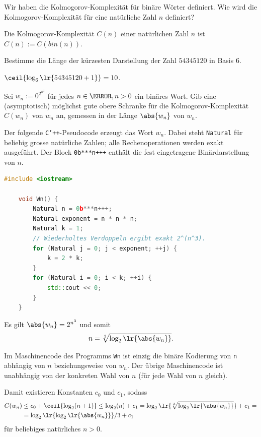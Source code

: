 \begin{questions}
	\question[2] Wir haben die Kolmogorov-Komplexität für binäre Wörter definiert. Wie wird die Kolmogorov-Komplexität für eine natürliche Zahl $n$ definiert?
	\begin{solution}
	Die Kolmogorov-Komplexität $C(n)$ einer natürlichen Zahl $n$ ist $C(n) := C(bin(n))$.
	\end{solution}


	\question[2] Bestimme die Länge der kürzesten Darstellung der Zahl $54345120$ in Basis $6$.
	\begin{solution}
		$\ceil{\log_6\lr{54345120 + 1}} = 10$.
	\end{solution}

	\question[2] Sei $w_n := 0^{2^{n^3}}$ für jedes $n\in\N, n>0$ ein binäres Wort.	Gib eine (asymptotisch) möglichst gute obere Schranke für die Kolmogorov-Komplexität $C(w_n)$ von $w_n$ an, gemessen in der Länge $\abs{w_n}$ von $w_n$.
	\begin{solution}
		Der folgende \texttt{C'++}-Pseudocode erzeugt das Wort $w_n$. Dabei steht \texttt{Natural} für beliebig grosse natürliche Zahlen; alle Rechenoperationen werden exakt ausgeführt. Der Block \texttt{0b***n+++} enthält die fest eingetragene Binärdarstellung von $n$.
		\begin{lstlisting}[language=C++,caption=$W_n$]
    #include <iostream>

    void Wn() {
        Natural n = 0b***n+++;
        Natural exponent = n * n * n;
        Natural k = 1;
        // Wiederholtes Verdoppeln ergibt exakt 2^(n^3).
        for (Natural j = 0; j < exponent; ++j) {
            k = 2 * k;
        }
        for (Natural i = 0; i < k; ++i) {
            std::cout << 0;
        }
    }
\end{lstlisting}
		Es gilt $\abs{w_n} = 2^{n^3}$ und somit
		\begin{align*}
			n = \sqrt[3]{\log_2\lr{\abs{w_n}}}.
		\end{align*}

		Im Maschinencode des Programms \texttt{Wn} ist einzig die binäre Kodierung von \texttt{n} abhängig von $n$ beziehungsweise von $w_n$. Der übrige Maschinencode ist unabhängig von der konkreten Wahl von $n$ (für jede Wahl von $n$ gleich).

		Damit existieren Konstanten $c_0$ und $c_1$, sodass
\begin{align*}
	C(w_n) &\leq c_0 + \ceil{\log_2(n+1)} \leq \log_2(n) + c_1 = \log_2\lr{\sqrt[3]{\log_2\lr{\abs{w_n}}}} + c_1 = \\
	&=\log_2\lr{\log_2\lr{\abs{w_n}}} / 3 + c_1
\end{align*}
für beliebiges natürliches $n>0$.
	\end{solution}


\end{questions}
